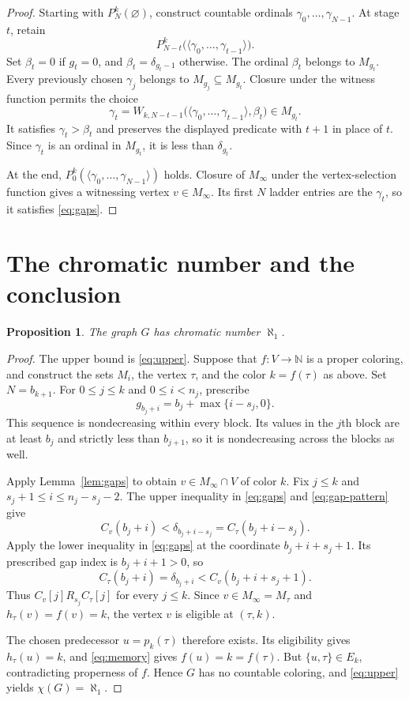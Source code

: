 \documentclass[11pt,leqno]{amsart}
\newtheorem{proposition}[theorem]{Proposition}
\theoremstyle{definition}
\numberwithin{equation}{section}
\newcommand{\N}{\mathbb N}
\newcommand{\seq}[1]{\langle #1\rangle}
\newcommand{\sub}{\subseteq}
\begin{document}
\begin{proof}
Starting with $P_N^k(\varnothing)$, construct countable ordinals $\gamma_0,\ldots,\gamma_{N-1}$. At stage $t$, retain
\[
P_{N-t}^k\bigl(\seq{\gamma_0,\ldots,\gamma_{t-1}}\bigr).
\]
Set $\beta_t=0$ if $g_t=0$, and $\beta_t=\delta_{g_t-1}$ otherwise. The ordinal $\beta_t$ belongs to $M_{g_t}$. Every previously chosen $\gamma_j$ belongs to $M_{g_j}\sub M_{g_t}$. Closure under the witness function permits the choice
\[
\gamma_t=W_{k,N-t-1}\bigl(\seq{\gamma_0,\ldots,\gamma_{t-1}},\beta_t\bigr)
\in M_{g_t}.
\]
It satisfies $\gamma_t>\beta_t$ and preserves the displayed predicate with $t+1$ in place of $t$. Since $\gamma_t$ is an ordinal in $M_{g_t}$, it is less than $\delta_{g_t}$.

At the end, $P_0^k(\seq{\gamma_0,\ldots,\gamma_{N-1}})$ holds. Closure of $M_\infty$ under the vertex-selection function gives a witnessing vertex $v\in M_\infty$. Its first $N$ ladder entries are the $\gamma_t$, so it satisfies \eqref{eq:gaps}.
\end{proof}

\section{The chromatic number and the conclusion}

\begin{proposition}\label{prop:uncountable}
The graph $G$ has chromatic number $\aleph_1$.
\end{proposition}

\begin{proof}
The upper bound is \eqref{eq:upper}. Suppose that $f\colon V\to\N$ is a proper coloring, and construct the sets $M_i$, the vertex $\tau$, and the color $k=f(\tau)$ as above. Set $N=b_{k+1}$. For $0\le j\le k$ and $0\le i<n_j$, prescribe
\begin{equation}\label{eq:gap-pattern}
g_{b_j+i}=b_j+\max\{i-s_j,0\}.
\end{equation}
This sequence is nondecreasing within every block. Its values in the $j$th block are at least $b_j$ and strictly less than $b_{j+1}$, so it is nondecreasing across the blocks as well.

Apply Lemma~\ref{lem:gaps} to obtain $v\in M_\infty\cap V$ of color $k$. Fix $j\le k$ and $s_j+1\le i\le n_j-s_j-2$. The upper inequality in \eqref{eq:gaps} and \eqref{eq:gap-pattern} give
\[
C_v(b_j+i)<\delta_{b_j+i-s_j}=C_\tau(b_j+i-s_j).
\]
Apply the lower inequality in \eqref{eq:gaps} at the coordinate $b_j+i+s_j+1$. Its prescribed gap index is $b_j+i+1>0$, so
\[
C_\tau(b_j+i)=\delta_{b_j+i}<C_v(b_j+i+s_j+1).
\]
Thus $C_v[j]\mathrel{R_{s_j}}C_\tau[j]$ for every $j\le k$. Since $v\in M_\infty=M_\tau$ and $h_\tau(v)=f(v)=k$, the vertex $v$ is eligible at $(\tau,k)$.

The chosen predecessor $u=p_k(\tau)$ therefore exists. Its eligibility gives $h_\tau(u)=k$, and \eqref{eq:memory} gives $f(u)=k=f(\tau)$. But $\{u,\tau\}\in E_k$, contradicting properness of $f$. Hence $G$ has no countable coloring, and \eqref{eq:upper} yields $\chi(G)=\aleph_1$.
\end{proof}
\end{document}
